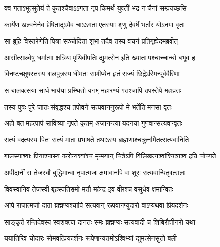 \begin{center}
\twolineshloka
{क्व गताऽभूत्सुतेयं ते कुतश्चैवाऽऽगता नृप}
{किमर्थं युवतीं भद्र न चैनां सम्प्रयच्छसि}




\twolineshloka
{कार्येण खल्वनेनैव प्रेषिताद्ऽयैव चाऽऽगता}
{एतस्याः शृणु देवर्षे भर्तारं योऽनया वृतः}




\twolineshloka
{सा ब्रूहि विस्तरेणेति पित्रा सञ्चोदिता शुभा}
{तदैव तस्य वचनं प्रतिगृह्येदमब्रवीत्}


\twolineshloka
{आसीत्साल्वेषु धर्मात्मा क्षत्रियः पृथिवीपतिः}
{द्युमत्सेन इति ख्यातः पश्चाच्चान्धो बभूव ह}


\twolineshloka
{विनष्टचक्षुषस्तस्य बालपुत्रस्य धीमतः}
{सामीप्येन हृतं राज्यं छिद्रेऽस्मिन्पूर्ववैरिणा}


\twolineshloka
{स बालवत्सया सार्धं भार्यया प्रस्थितो वनम्}
{महारण्यं गतश्चापि तपस्तेपे महाव्रतः}


\twolineshloka
{तस्य पुत्रः पुरे जातः संवृद्धश्च तपोवने}
{सत्यवाननुरूपो मे भर्तेति मनसा वृतः}




\twolineshloka
{अहो बत महत्पापं सावित्र्या नृपते कृतम्}
{अजानन्त्या यदनया गुणवान्सत्यवान्वृतः}


\twolineshloka
{सत्यं वदत्यस्य पिता सत्यं माता प्रभाषते}
{तथाऽस्य ब्राह्मणाश्चक्रुर्नामैतत्सत्यवानिति}


\twolineshloka
{बालस्याश्वाः प्रियाश्चास्य करोत्यश्वांश्च मृन्मयान्}
{चित्रेऽपि विलिखत्यश्वांश्चित्राश्व इति चोच्यते}




\twolineshloka
{अपीदानीं स तेजस्वी बुद्धिमान्वा नृपात्मजः}
{क्षमावानपि वा शूरः सत्यवान्पितृवत्सलः}




\twolineshloka
{विवस्वानिव तेजस्वी बृहस्पतिसमो मतौ}
{महेन्द्र इव वीरश्च वसुधेव क्षमान्वितः}




\twolineshloka
{अपि राजात्मजो दाता ब्रह्मण्यश्चापि सत्यवान्}
{रूपवानप्युदारो वाऽप्यथवा प्रियदर्शनः}




\twolineshloka
{साङ्कृते रन्तिदेवस्य स्वशक्त्या दानतः समः}
{ब्रह्मण्यः सत्यवादी च शिबिरौशीनरो यथा}


\twolineshloka
{ययातिरिव चोदारः सोमवत्प्रियदर्शनः}
{रूपेणान्यतमोऽश्विभ्यां द्युमत्सेनसुतो बली}



\end{center}
